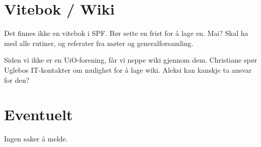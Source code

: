 \documentclass[12pt,norsk]{article}
\begin{document}
\section{Vitebok / Wiki}
Det finnes ikke en vitebok i SPF. Bør sette en frist for 
å lage en. Mai? Skal ha med alle rutiner, 
og referater fra møter og generalforsamling.

Siden vi ikke er en UiO-forening, får vi neppe wiki gjennom dem. 
Christiane spør Uglebos IT-kontakter om mulighet for å lage wiki. 
Aleksi kan kanskje ta ansvar for den?

\section{Eventuelt}
Ingen saker å melde.
\end{document}
